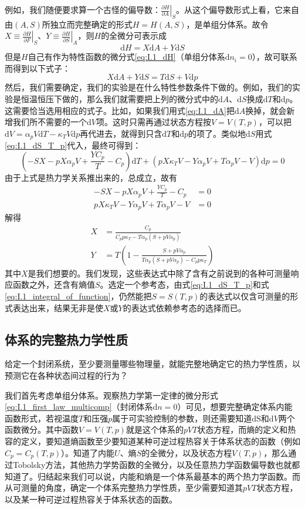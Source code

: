 \documentclass[main.tex]{subfiles}
\begin{document}
例如，我们随便要求算一个古怪的偏导数：$\left.\frac{\partial H}{\partial A}\right|_{S}$。从这个偏导数形式上看，它来自由$\left(A,S\right)$所独立而完整确定的形式$H=H\left(A,S\right)$，是单组分体系。故令$X\equiv\left.\frac{\partial H}{\partial F}\right|_{S}$、$Y\equiv\left.\frac{\partial H}{\partial S}\right|_{A}$，则$H$的全微分可表示成
\[\mathrm{d}H=X\mathrm{d}A+Y\mathrm{d}S\]
但是$H$自己有作为特性函数的微分式\eqref{eq:I.1_dH}（单组分体系$\mathrm{d}n_i=0$），故可联系而得到以下式子：
\[X\mathrm{d}A+Y\mathrm{d}S=T\mathrm{d}S+V\mathrm{d}p\]
然后，我们需要确定，我们的实验是在什么特性参数条件下做的。例如，我们的实验是恒温恒压下做的，那么我们就需要把上列的微分式中的$\mathrm{d}A$、$\mathrm{d}S$换成$\mathrm{d}T$和$\mathrm{d}p$。这需要恰当选用相应的式子。比如，如果我们用式\eqref{eq:I.1_dA}把$\mathrm{d}A$换掉，就会新增我们所不需要的一个$\mathrm{d}V$项。这时只需再通过状态方程按$V=V\left(T,p\right)$，可以把$\mathrm{d}V=\alpha_pV\mathrm{d}T-\kappa_TV\mathrm{d}p$再代进去，就得到只含$\mathrm{d}T$和$\mathrm{d}p$的项了。类似地$\mathrm{d}S$用式\eqref{eq:I.1_dS_T_p}代入，最终可得到：
\[\left(-SX-pX\alpha_pV+\frac{YC_p}{T}-C_p\right)\mathrm{d}T+\left(pX\kappa_TV-Y\alpha_pV+T\alpha_pV-V\right)\mathrm{d}p=0\]
由于上式是热力学关系推出来的，总成立，故有
\begin{align*}
    -SX-pX\alpha_pV+\frac{YC_p}{T}-C_p  & =0 \\
    pX\kappa_TV-Y\alpha_pV+T\alpha_pV-V & =0
\end{align*}
解得
\begin{align*}
    X & =\frac{C_p}{C_p p \kappa_T-T\alpha_p\left(S+pV\alpha_p\right)}                          \\
    Y & =T\left(1-\frac{S+p V \alpha_p}{T\alpha_p\left(S+pV\alpha_p\right)-C_pp\kappa_T}\right)
\end{align*}
其中$X$是我们想要的。我们发现，这些表达式中除了含有之前说到的各种可测量响应函数之外，还含有熵值$S$。选定一个参考态，由式\eqref{eq:I.1_dS_T_p}和式\eqref{eq:I.1_integral_of_function}，仍然能把$S=S\left(T,p\right)$的表达式以仅含可测量的形式表达出来，结果无非是使$X$或$Y$的表达式依赖参考态的选择而已。

\subsection{体系的完整热力学性质}
给定一个封闭系统，至少要测量哪些物理量，就能完整地确定它的热力学性质，以预测它在各种状态间过程的行为？

我们首先考虑单组分体系。观察热力学第一定律的微分形式\eqref{eq:I.1_first_law_multicomp}（封闭体系$\mathrm{d}n=0$）可见，想要完整确定体系内能函数形式，若视温度$T$和压强$p$属于可实验控制的参数，则还需要知道$\mathrm{dS}$和$\mathrm{d}V$两个函数微分。其中函数$V=V\left(T,p\right)$就是这个体系的$pVT$状态方程，而熵的定义和热容的定义，要知道熵函数至少要知道某种可逆过程热容关于体系状态的函数（例如$C_p=C_p\left(T,p\right)$）。知道了内能$U$、熵$S$的全微分，以及状态方程$V\left(T,p\right)$，那么通过Tobolsky方法，其他热力学势函数的全微分，以及任意热力学函数偏导数也就都知道了。归结起来我们可以说，内能和熵是一个体系最基本的两个热力学函数。而从可测量的角度，确定一个体系完整热力学性质，至少需要知道其$pVT$状态方程，以及某一种可逆过程热容关于体系状态的函数。
\end{document}
